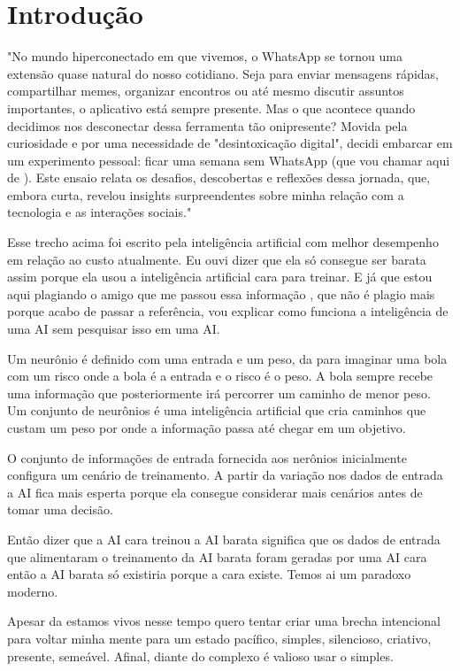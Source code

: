 \chapter{Introdução}\label{capitulo1}
"No mundo hiperconectado em que vivemos, o WhatsApp se tornou uma extensão quase natural do nosso cotidiano. Seja para enviar mensagens rápidas, compartilhar memes, organizar encontros ou até mesmo discutir assuntos importantes, o aplicativo está sempre presente. Mas o que acontece quando decidimos nos desconectar dessa ferramenta tão onipresente? Movida pela curiosidade e por uma necessidade de "desintoxicação digital", decidi embarcar em um experimento pessoal: ficar uma semana sem WhatsApp (que vou chamar aqui de ). Este ensaio relata os desafios, descobertas e reflexões dessa jornada, que, embora curta, revelou insights surpreendentes sobre minha relação com a tecnologia e as interações sociais."

Esse trecho acima foi escrito pela inteligência artificial com melhor desempenho em relação ao custo atualmente. Eu ouvi dizer que ela só consegue ser barata assim porque ela usou a inteligência artificial cara para treinar. E já que estou aqui plagiando o amigo que me passou essa informação , que não é plagio mais porque acabo de passar a referência, vou explicar como funciona a inteligência de uma AI sem pesquisar isso em uma AI.

Um neurônio é definido com uma entrada e um peso, da para imaginar uma bola com um risco onde a bola é a entrada e o risco é o peso. A bola sempre recebe uma informação que posteriormente irá percorrer um caminho de menor peso. Um conjunto de neurônios é uma inteligência artificial que cria caminhos que custam um peso por onde a informação passa até chegar em um objetivo.

O conjunto de informações de entrada fornecida aos nerônios inicialmente configura um cenário de treinamento. A partir da variação nos dados de entrada a AI fica mais esperta porque ela consegue considerar mais cenários antes de tomar uma decisão.

Então dizer que a AI cara treinou a AI barata significa que os dados de entrada que alimentaram o treinamento da AI barata foram geradas por uma AI cara então a AI barata só existiria porque a cara existe. Temos ai um paradoxo moderno.


Apesar da estamos vivos nesse tempo quero tentar criar uma brecha intencional para voltar minha mente para um estado pacífico, simples, silencioso, criativo, presente, semeável. Afinal, diante do complexo é valioso usar o simples.

